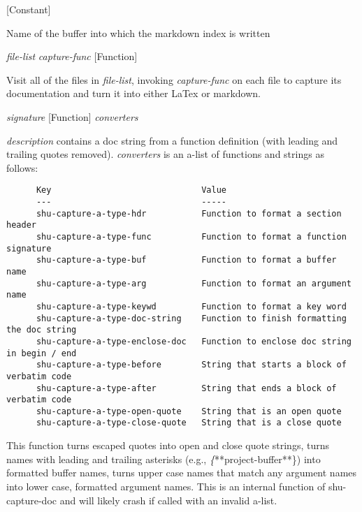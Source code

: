 \vspace{1em}
\noindent
{}
\usebox{\funcname}
 \hfill [Constant]

\begin{doc-string}
Name of the buffer into which the markdown index is written
\end{doc-string}

\vspace{1em}
\noindent
{}
\usebox{\funcname}\emph{file-list} \emph{capture-func}
 \hfill [Function]

\begin{doc-string}
Visit all of the files in \emph{file-list}, invoking \emph{capture-func} on each
file to capture its documentation and turn it into either LaTex or
markdown.
\end{doc-string}

\vspace{1em}
\noindent
{}
\usebox{\funcname}\emph{signature}
 \hfill [Function]
\hspace*{\wd\funcname}\emph{converters}

\begin{doc-string}
\emph{description} contains a doc string from a function definition (with leading
and trailing quotes removed).  \emph{converters} is an a-list of functions and strings as
follows:

\small{\begin{verbatim}
      Key                              Value
      ---                              -----
      shu-capture-a-type-hdr           Function to format a section header
      shu-capture-a-type-func          Function to format a function signature
      shu-capture-a-type-buf           Function to format a buffer name
      shu-capture-a-type-arg           Function to format an argument name
      shu-capture-a-type-keywd         Function to format a key word
      shu-capture-a-type-doc-string    Function to finish formatting the doc string
      shu-capture-a-type-enclose-doc   Function to enclose doc string in begin / end
      shu-capture-a-type-before        String that starts a block of verbatim code
      shu-capture-a-type-after         String that ends a block of verbatim code
      shu-capture-a-type-open-quote    String that is an open quote
      shu-capture-a-type-close-quote   String that is a close quote
\end{verbatim}}

This function turns escaped quotes into open and close quote strings, turns names
with leading and trailing asterisks (e.g., \emph\{**project-buffer**\}) into formatted buffer
names, turns upper case names that match any argument names into lower case,
formatted argument names.  This is an internal function of shu-capture-doc and
will likely crash if called with an invalid a-list.
\end{doc-string}

